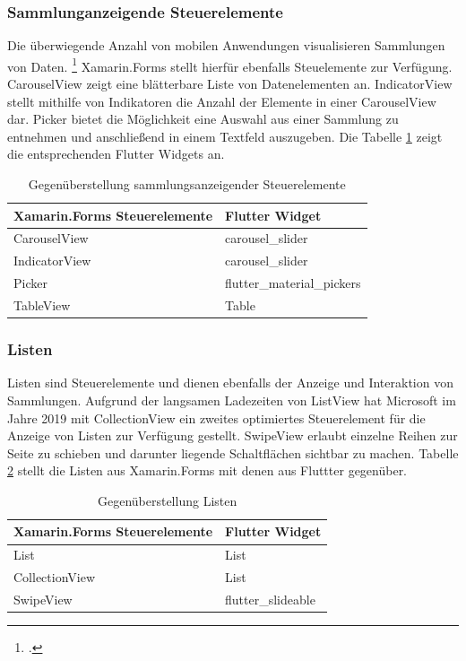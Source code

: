 \subsubsection{Sammlunganzeigende Steuerelemente}
Die überwiegende Anzahl von mobilen Anwendungen visualisieren Sammlungen von Daten. \footcite[Vgl.][S. 180]{Hindrikes2020}  Xamarin.Forms stellt hierfür ebenfalls Steuelemente zur Verfügung. \glq CarouselView\grq{}  zeigt eine blätterbare Liste von Datenelementen an.   \glq IndicatorView\grq{} stellt mithilfe von Indikatoren die Anzahl der Elemente in einer  \glq CarouselView\grq{} dar.  \glq Picker\grq{}  bietet die Möglichkeit eine Auswahl aus einer Sammlung zu entnehmen und anschließend in einem Textfeld auszugeben.   Die Tabelle \ref{tab:Collections} zeigt die entsprechenden Flutter Widgets an.


\begin{table}[!ht]
\begin{tabularx}{\textwidth}{X|X}
   \textbf{Xamarin.Forms Steuerelemente} & \textbf{Flutter Widget}  \\
\hline
	CarouselView		       		&  	carousel\_slider  		\\ 
	IndicatorView		       		&  	carousel\_slider		\\ 	
	Picker		       					&  	flutter\_material\_pickers		\\ 
	TableView		       				&  	Table		\\ 
\end{tabularx}
\caption{Gegenüberstellung sammlungsanzeigender Steuerelemente}
 \label{tab:Collections}
\end{table}


\subsubsection{Listen}

Listen sind  Steuerelemente und dienen ebenfalls der Anzeige und Interaktion von Sammlungen.  Aufgrund der langsamen Ladezeiten von \glq ListView\grq{} hat Microsoft im Jahre 2019 mit  \glq CollectionView\grq{}  ein zweites optimiertes Steuerelement für die Anzeige von Listen zur Verfügung gestellt.   \glq SwipeView\grq{} erlaubt einzelne Reihen zur Seite zu schieben und darunter liegende Schaltflächen sichtbar zu machen.  Tabelle \ref{tab:Listview} stellt die Listen aus Xamarin.Forms mit denen aus Fluttter gegenüber.  
\begin{table}[!ht]
\begin{tabularx}{\textwidth}{X|X}
   \textbf{Xamarin.Forms Steuerelemente} & \textbf{Flutter Widget}  \\
\hline
	List		       				&  	List 		\\ 
	CollectionView		       				&  	List 		\\ 
	SwipeView		       		&  	flutter\_slideable 		\\ 
\end{tabularx}
\caption{Gegenüberstellung Listen}
 \label{tab:Listview}
\end{table}

